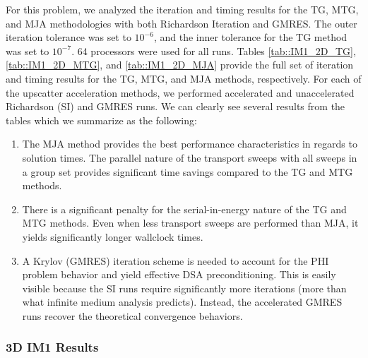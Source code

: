 For this problem, we analyzed the iteration and timing results for the TG, MTG, and MJA methodologies with both Richardson Iteration and GMRES. The outer iteration tolerance was set to $10^{-6}$, and the inner tolerance for the TG method was set to $10^{-7}$. 64 processors were used for all runs. Tables \ref{tab::IM1_2D_TG}, \ref{tab::IM1_2D_MTG}, and \ref{tab::IM1_2D_MJA} provide the full set of iteration and timing results for the TG, MTG, and MJA methods, respectively. For each of the upscatter acceleration methods, we performed accelerated and unaccelerated Richardson (SI) and GMRES runs. We can clearly see several results from the tables which we summarize as the following:

\begin{enumerate}
\item The MJA method provides the best performance characteristics in regards to solution times. The parallel nature of the transport sweeps with all sweeps in a group set provides significant time savings compared to the TG and MTG methods.
\item There is a significant penalty for the serial-in-energy nature of the TG and MTG methods. Even when less transport sweeps are performed than MJA, it yields significantly longer wallclock times.
\item A Krylov (GMRES) iteration scheme is needed to account for the PHI problem behavior and yield effective DSA preconditioning. This is easily visible because the SI runs require significantly more iterations (more than what infinite medium analysis predicts). Instead, the accelerated GMRES runs recover the theoretical convergence behaviors.
\end{enumerate}


\subsubsection{3D IM1 Results}
\label{sec::DSA_Results_IM1_3D}

